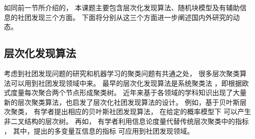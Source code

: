 如同前一节所介绍的， 本课题主要包含层次化发现算法、随机块模型及有辅助信息的社团发现三个方面。
下面将分别从这三个方面进一步阐述国内外研究的动态。
\subsection{层次化发现算法}
考虑到社团发现问题的研究和机器学习的聚类问题有共通之处，
很多层次聚类算法可以用到社团发现领域中来。
最早的层次化发现算法是系统聚类法 \cite{slink}，即根据欧式度量每次聚合两个节点形成聚类树。
近年来基于各领域的学科知识出现了大量新的层次聚类算法，也启发了层次化社团发现算法的设计。
例如，基于贝叶斯层次聚类\cite{heller2005bhc}，
有学者提出相应的贝叶斯社团发现算法\cite{blundell2011discovering, blundell2013bhcd}，
在给定的概率模型下
可以产生非二叉结构的层次树。
再如，
有学者利用信息论度量代替传统层次聚类中的指标
\cite{gokcay2002clustering,aghagolzadeh2007hierarchical,chan2016ic}，
其中，\citet{chan2016ic}提出的多变量互信息的指标
可应用到社团发现领域\cite{chan2017pin}。


